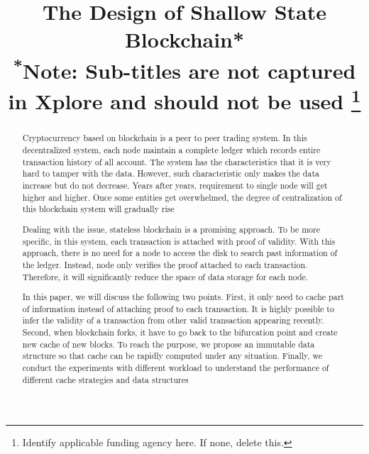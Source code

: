 \documentclass[conference]{IEEEtran}
\begin{document}
\title{The Design of Shallow State Blockchain*\\
{\footnotesize \textsuperscript{*}Note: Sub-titles are not captured in Xplore and
should not be used}
\thanks{Identify applicable funding agency here. If none, delete this.}
}

\author{
\and
{}
\and
{}
}

\maketitle

\begin{abstract}
Cryptocurrency based on blockchain is a peer to peer trading system.
In this decentralized system, each node maintain a complete ledger which records entire transaction history of all account.
The system has the characteristics that it is very hard to tamper with the data.
However, such characteristic only makes the data increase but do not decrease.
Years after years, requirement to single node will get higher and higher.
Once some entities get overwhelmed, the degree of centralization of this blockchain system will gradually rise

Dealing with the issue, stateless blockchain is a promising approach.
To be more specific, in this system, each transaction is attached with proof of validity.
With this approach, there is no need for a node to access the disk to search past information of the ledger.
Instead, node only verifies the proof attached to each transaction.
Therefore, it will significantly reduce the space of data storage for each node.

In this paper, we will discuss the following two points.
First, it only need to cache part of information instead of attaching proof to each transaction.
It is highly possible to infer the validity of a transaction from other valid transaction appearing recently.
Second, when blockchain forks, it have to go back to the bifurcation point and create new cache of new blocks.
To reach the purpose, we propose an immutable data structure so that cache can be rapidly computed under any situation.
Finally, we conduct the experiments with different workload to understand the performance of different cache strategies and data structures
\end{abstract}
\end{document}
